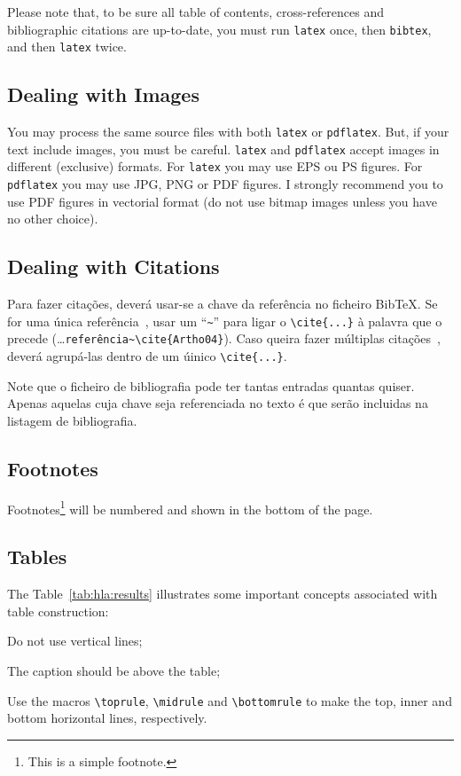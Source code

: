 	Please note that, to be sure all table of contents, cross-references and bibliographic citations are up-to-date, you must run \verb!latex! once, then \verb!bibtex!, and then \verb!latex! twice.
	
	\subsection{Dealing with Images} %
	\label{sub:dealing_with_images}
	
	You may process the same source files with both \verb!latex! or \verb!pdflatex!. But, if your text include images, you must be careful. \verb!latex! and \verb!pdflatex! accept images in different (exclusive) formats.  For \verb!latex! you may use EPS ou PS figures. For \verb!pdflatex! you may use JPG, PNG or PDF figures.  I strongly recommend you to use PDF figures in vectorial format (do not use bitmap images unless you have no other choice).
	
	
	\subsection{Dealing with Citations} %
	
	Para fazer citações, deverá usar-se a chave da referência no ficheiro BibTeX. Se for uma única referência~\cite{Artho04}, usar um ``\verb!~!'' para ligar o \verb!\cite{...}! à palavra que o precede (\ldots\verb!referência~\cite{Artho04}!).  Caso queira fazer múltiplas citações~\cite{Shavit95,Silberschatz06,Moss85}, deverá agrupá-las dentro de um úinico \verb!\cite{...}!.
	
	Note que o ficheiro de bibliografia pode ter tantas entradas quantas quiser. Apenas aquelas cuja chave seja referenciada no texto é que serão incluidas na listagem de bibliografia.
	
	
	\subsection{Footnotes} %
	
	Footnotes\footnote{This is a simple footnote.} will be numbered and shown in the bottom of the page.
	
	
	\subsection{Tables} %
	
	The Table~\ref{tab:hla:results} illustrates some important concepts associated with table construction:
	\begin{asparaenum}[i)]
		\item Do not use vertical lines;
		\item The caption should be above the table;
		\item Use the macros \verb!\toprule!, \verb!\midrule! and \verb!\bottomrule! to make the top, inner and bottom horizontal lines, respectively.
	\end{asparaenum}
	
